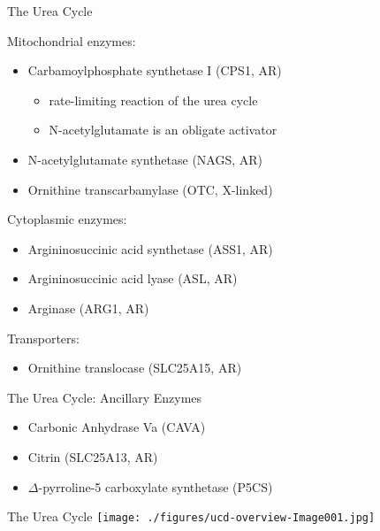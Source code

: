 \documentclass[presentation, smaller]{beamer}
\begin{document}
\begin{frame}[label={sec:orgheadline3}]{The Urea Cycle}
\begin{block}{Mitochondrial enzymes:}
\begin{itemize}
\item Carbamoylphosphate synthetase I (CPS1, AR)
\begin{itemize}
\item rate-limiting reaction of the urea cycle
\item N-acetylglutamate is an obligate activator
\end{itemize}
\item N-acetylglutamate synthetase (NAGS, AR)
\item Ornithine transcarbamylase (OTC, X-linked)
\end{itemize}
\end{block}
\begin{block}{Cytoplasmic enzymes:}
\begin{itemize}
\item Argininosuccinic acid synthetase (ASS1, AR)
\item Argininosuccinic acid lyase (ASL, AR)
\item Arginase (ARG1, AR)
\end{itemize}
\end{block}

\begin{block}{Transporters:}
\begin{itemize}
\item Ornithine translocase (SLC25A15, AR)
\end{itemize}
\end{block}
\end{frame}

\begin{frame}[label={sec:orgheadline4}]{The Urea Cycle: Ancillary Enzymes}
\begin{itemize}
\item Carbonic Anhydrase Va (CAVA)
\item Citrin (SLC25A13, AR)
\item \(\Delta\)-pyrroline-5 carboxylate synthetase (P5CS)
\end{itemize}
\end{frame}


\begin{frame}[label={sec:orgheadline5}]{The Urea Cycle}
\texttt{[image: ./figures/ucd-overview-Image001.jpg]}
\end{frame}
\end{document}
